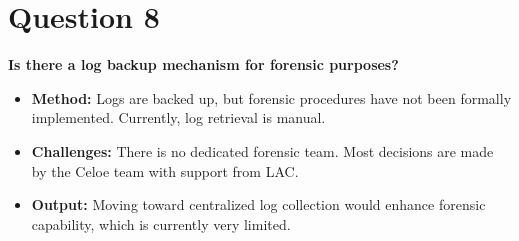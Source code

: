 \section*{Question 8}
\textbf{Is there a log backup mechanism for forensic purposes?}

\begin{itemize}
	\item \textbf{Method:} Logs are backed up, but forensic procedures have not been formally implemented. Currently, log retrieval is manual.
	\item \textbf{Challenges:} There is no dedicated forensic team. Most decisions are made by the Celoe team with support from LAC.
	\item \textbf{Output:} Moving toward centralized log collection would enhance forensic capability, which is currently very limited.
\end{itemize}

